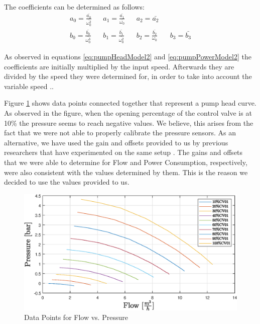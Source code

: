 \newpage
The coefficients can be determined as follows:
\begin{align*}
	a_0 = \frac{\bar{a_0}}{\bar{\omega_0^2}} && a_1 = \frac{\bar{a_1}}{\bar{\omega_0}} && a_2 = \bar{a_2} \\
	b_0 = \frac{\bar{b_0}}{\bar{\omega_0^3}} && b_1 = \frac{\bar{b_1}}{\bar{\omega_0^2}} && b_2 = \frac{\bar{b_2}}{\omega_0} && b_3 = \bar{b_3}
\end{align*}
\cite{Yang2010}

As observed in equations \ref{eq:pumpHeadModel2} and \ref{eq:pumpPowerModel2} the coefficients are
initially multiplied by the input speed. Afterwards they are divided by the
speed they were determined for, in order to take into account the variable speed \cite{Yang2010}..

Figure \ref{fig:flowVsPressure} shows data points connected together that represent 
a pump head curve. As observed in the figure, when the opening percentage of the control valve is at
10\% the pressure seems to reach negative values. We believe, this arises from the fact that we were not 
able to properly calibrate the pressure sensors. As an alternative, we have used the gain and offsets
provided to us by previous researchers that have experimented on the same setup \cite{Jepsen2017}.
The gains and offsets that we were able to determine for Flow and Power Consumption,
respectively, were also consistent with the values determined by them.
This is the reason we decided to use the values provided to us.

\begin{figure}[h]
	\centering
	\includegraphics[width=1\textwidth]{figures/05mathematicalModelling/flowVsPressureRun34.eps}
	\caption{Data Points for Flow vs. Pressure}
	\label{fig:flowVsPressure}
\end{figure}

